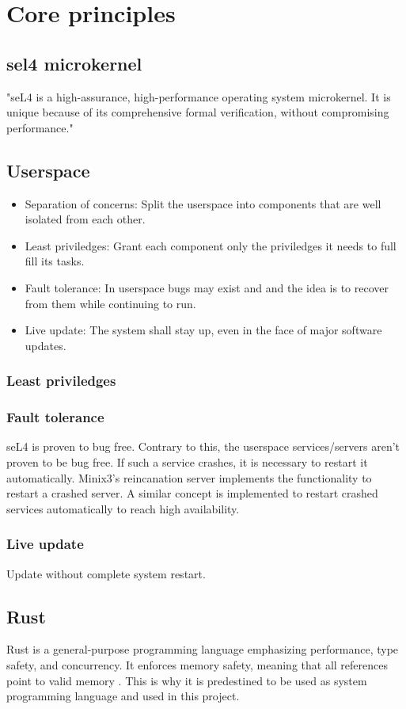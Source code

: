 \section{Core principles}


\subsection{sel4 microkernel}
"seL4 is a high-assurance, high-performance operating system microkernel. It is unique because of its comprehensive formal verification, without compromising performance." \cite{seL4:2024}

\subsection{Userspace}

\begin{itemize}
    \item Separation of concerns: Split the userspace into components that are well isolated from each other.
    \item Least priviledges: Grant each component only the priviledges it needs to full fill its tasks.    
    \item Fault tolerance: In userspace bugs may exist and and the idea is to recover from them while continuing to run.
    \item Live update: The system shall stay up, even in the face of major software updates.
\end{itemize}

\subsubsection{Least priviledges}

\subsubsection{Fault tolerance}
seL4 is proven to bug free. Contrary to this, the userspace services/servers aren't proven to be bug free. If such a service crashes, it is necessary to restart it automatically.
Minix3's reincanation server \cite{minix3:2010} implements the functionality to restart a crashed server. A similar concept is implemented to restart crashed services automatically to reach 
high availability.

\subsubsection{Live update}
Update without complete system restart.

\subsection{Rust}
Rust is a general-purpose programming language emphasizing performance, type safety, and concurrency. It enforces memory safety, 
meaning that all references point to valid memory \cite{rust:2025}. This is why it is predestined to be used as system programming language and used in this project.
